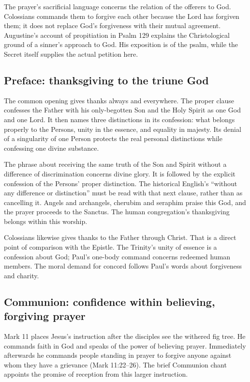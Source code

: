 The prayer's sacrificial language concerns the relation of the offerers
to God. Colossians commands them to forgive each other because the Lord
has forgiven them; it does not replace God's forgiveness with their mutual
agreement. Augustine's account of propitiation in Psalm 129 explains the
Christological ground of a sinner's approach to God. His exposition is
of the psalm, while the Secret itself supplies the actual petition here.

\subsection{Preface: thanksgiving to the triune God}
The common opening gives thanks always and everywhere. The proper clause
confesses the Father with his only-begotten Son and the Holy Spirit as
one God and one Lord. It then names three distinctions in its confession:
what belongs properly to the Persons, unity in the essence, and equality
in majesty. Its denial of a singularity of one Person protects the real
personal distinctions while confessing one divine substance.

The phrase about receiving the same truth of the Son and Spirit without
a difference of discrimination concerns divine glory. It is followed by
the explicit confession of the Persons' proper distinction. The
historical English's ``without any difference or distinction'' must be
read with that next clause, rather than as cancelling it. Angels and
archangels, cherubim and seraphim praise this God, and the prayer proceeds
to the Sanctus. The human congregation's thanksgiving belongs within
this worship.

Colossians likewise gives thanks to the Father through Christ. That is
a direct point of comparison with the Epistle. The Trinity's unity of
essence is a confession about God; Paul's one-body command concerns
redeemed human members. The moral demand for concord follows Paul's
words about forgiveness and charity.

\subsection{Communion: confidence within believing, forgiving prayer}
Mark 11 places Jesus's instruction after the disciples see the withered
fig tree. He commands faith in God and speaks of the power of believing
prayer. Immediately afterwards he commands people standing in prayer to
forgive anyone against whom they have a grievance (Mark 11:22--26).
The brief Communion chant appoints the promise of reception from this
larger instruction.

